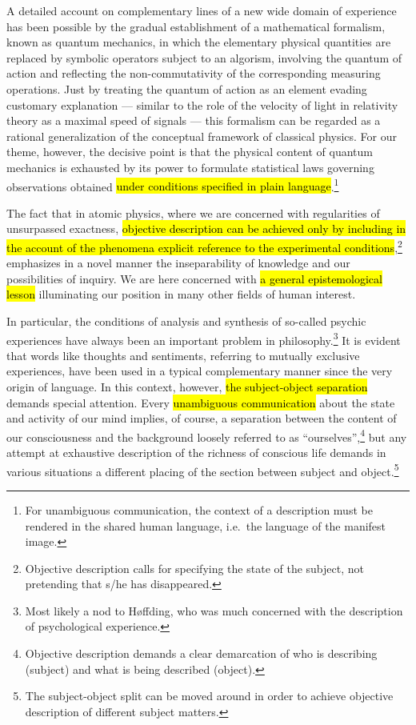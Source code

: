 \documentclass{tufte-handout}
\begin{document}
A detailed account on complementary lines of a new wide domain of
experience has been possible by the gradual establishment of a
mathematical formalism, known as quantum mechanics, in which the
elementary physical quantities are replaced by symbolic operators
subject to an algorism, involving the quantum of action and reflecting
the non-commutativity of the corresponding measuring operations.  Just
by treating the quantum of action as an element evading customary
explanation --- similar to the role of the velocity of light in
relativity theory as a maximal speed of signals --- this formalism can
be regarded as a rational generalization of the conceptual framework
of classical physics. For our theme, however, the decisive point is
that the physical content of quantum mechanics is exhausted by its
power to formulate statistical laws governing observations obtained
\hl{under conditions specified in plain language}.\footnote{For
  unambiguous communication, the context of a description must be
  rendered in the shared human language, i.e.\ the language of the
  manifest image.}

The fact that in atomic physics, where we are concerned with
regularities of unsurpassed exactness, \hl{objective description can
  be achieved only by including in the account of the phenomena
  explicit reference to the experimental
  conditions},\footnote{Objective description calls for specifying the
  state of the subject, not pretending that s/he has disappeared.}
emphasizes in a novel manner the inseparability of knowledge and our
possibilities of inquiry. We are here concerned with \hl{a general
  epistemological lesson} illuminating our position in many other
fields of human interest.

In particular, the conditions of analysis and synthesis of so-called
psychic experiences have always been an important problem in
philosophy.\footnote{Most likely a nod to Høffding, who was much
  concerned with the description of psychological experience.} It is
evident that words like thoughts and sentiments, referring to mutually
exclusive experiences, have been used in a typical complementary
manner since the very origin of language. In this context, however,
\hl{the subject-object separation} demands special attention. Every
\hl{unambiguous communication} about the state and activity of our
mind implies, of course, a separation between the content of our
consciousness and the background loosely referred to as
``ourselves'',\footnote{Objective description demands a clear
  demarcation of who is describing (subject) and what is being
  described (object).} but any attempt at exhaustive description of
the richness of conscious life demands in various situations a
different placing of the section between subject and
object.\footnote{The subject-object split can be moved around in order
  to achieve objective description of different subject matters.}
\end{document}
